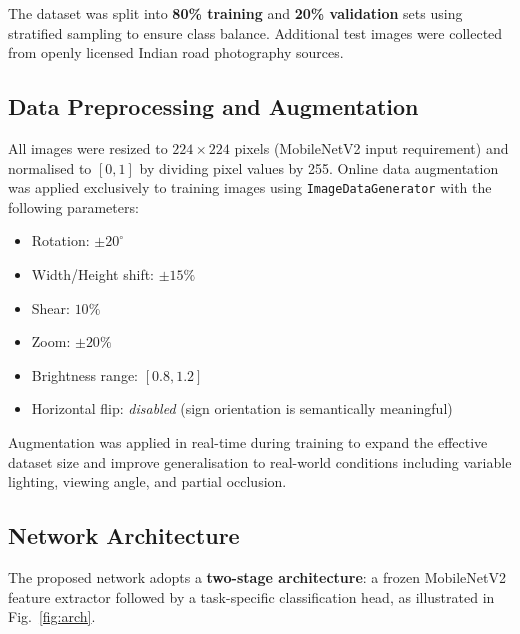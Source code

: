 \documentclass[journal,10pt,twocolumn]{IEEEtran}
\begin{document}
The dataset was split into \textbf{80\% training} and \textbf{20\% validation}
sets using stratified sampling to ensure class balance. Additional test images
were collected from openly licensed Indian road photography sources.

\subsection{Data Preprocessing and Augmentation}

All images were resized to $224 \times 224$ pixels (MobileNetV2 input
requirement) and normalised to $[0, 1]$ by dividing pixel values by 255.
Online data augmentation was applied exclusively to training images using
\texttt{ImageDataGenerator} with the following parameters:

\begin{itemize}[nosep, leftmargin=*]
  \item Rotation: $\pm 20^\circ$
  \item Width/Height shift: $\pm 15\%$
  \item Shear: $10\%$
  \item Zoom: $\pm 20\%$
  \item Brightness range: $[0.8, 1.2]$
  \item Horizontal flip: \textit{disabled} (sign orientation is semantically
        meaningful)
\end{itemize}

Augmentation was applied in real-time during training to expand the effective
dataset size and improve generalisation to real-world conditions including
variable lighting, viewing angle, and partial occlusion.

\subsection{Network Architecture}

The proposed network adopts a \textbf{two-stage architecture}: a frozen
MobileNetV2 feature extractor followed by a task-specific classification head,
as illustrated in Fig.~\ref{fig:arch}.
\end{document}
